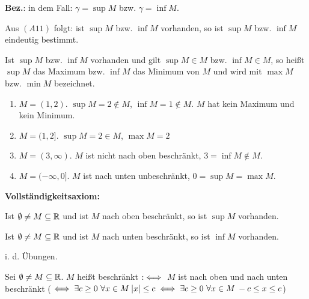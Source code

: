 \textbf{Bez.}: in dem Fall: $\gamma = \sup M$ bzw. $\gamma = \inf M$.
\newline


Aus \hyperref[a.axiom-a11]{$(A11)$} folgt: ist $\sup M$ bzw. $\inf M$ vorhanden, so ist $\sup M$ bzw. $\inf M$ eindeutig bestimmt.
\newline


Ist $\sup M$ bzw. $\inf M$ vorhanden und gilt $\sup M \in M$ bzw. $\inf M \in M$, so hei{\ss}t $\sup M$ das Maximum bzw. $\inf M$ das Minimum von $M$ und wird mit $\max M$ bzw. $\min M$ bezeichnet.


\begin{beispiele*}
	\begin{enumerate}
		\item $M = (1, 2)$. $\sup M = 2 \notin M$, $\inf M = 1 \notin M$. $M$ hat kein Maximum und kein Minimum.
		\item $M = (1, 2]$. $\sup M = 2 \in M$, $\max M = 2$
		\item $M = (3, \infty)$. $M$ ist nicht nach oben beschränkt, $3 = \inf M \notin M$.
		\item $M = (-\infty, 0]$. $M$ ist nach unten unbeschränkt, $0 = \sup M = \max M$.
	\end{enumerate}
\end{beispiele*}



\textbf{Vollständigkeitsaxiom:}  \vspace{-0.25cm}
\begin{description} \label{v.axiom-a10}
	\item[\hspace{0.4cm}$(A15)$]Ist $\emptyset \neq M \subseteq \mathbb{R}$ und ist $M$ nach oben beschränkt, so ist $\sup M$ vorhanden.
\end{description}

\begin{satz} \label{satz-1.1}
	Ist $\emptyset \neq M \subseteq \mathbb{R}$ und ist $M$ nach unten beschränkt, so ist $\inf M$ vorhanden.
\end{satz} 

\begin{beweis}
	i. d. Übungen.
\end{beweis}


\begin{definition*} 
	Sei $\emptyset \neq M \subseteq \mathbb{R}$. $M$ hei{\ss}t beschränkt $:\iff$ $M$ ist nach oben und nach unten beschränkt ($\iff \exists c \geq 0 ~\forall x \in M \: |x| \leq c \iff \exists c \geq 0 ~\forall x \in M \: - c \leq x \leq c$)
\end{definition*}


